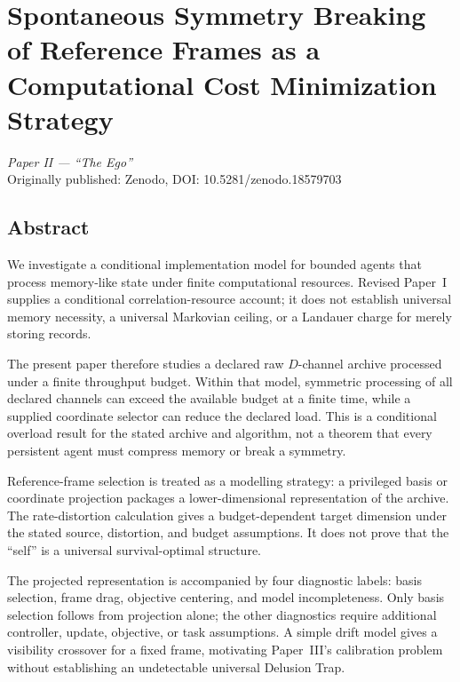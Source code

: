 \documentclass[12pt,a4paper,openany]{book}
\begin{document}

\chapter{Spontaneous Symmetry Breaking of Reference Frames as a Computational Cost Minimization Strategy}
\label{T-chap:paperII}

\begin{center}
\textit{Paper II --- ``The Ego''}\\[0.5em]
Originally published: Zenodo, DOI: 10.5281/zenodo.18579703
\end{center}

\bigskip

\section*{Abstract}
We investigate a conditional implementation model for bounded agents
that process memory-like state under finite computational resources.
Revised Paper~I~\cite{Liu2026TDOME_I} supplies a conditional
correlation-resource account; it does not establish universal memory
necessity, a universal Markovian ceiling, or a Landauer charge for
merely storing records.

The present paper therefore studies a declared raw $D$-channel archive
processed under a finite throughput budget.  Within that model,
symmetric processing of all declared channels can exceed the available
budget at a finite time, while a supplied coordinate selector can reduce
the declared load.  This is a conditional overload result for the stated
archive and algorithm, not a theorem that every persistent agent must
compress memory or break a symmetry.

Reference-frame selection is treated as a modelling strategy: a
privileged basis or coordinate projection packages a lower-dimensional
representation of the archive.  The rate-distortion calculation gives a
budget-dependent target dimension under the stated source, distortion,
and budget assumptions.  It does not prove that the ``self'' is a
universal survival-optimal structure.

The projected representation is accompanied by four diagnostic labels:
basis selection, frame drag, objective centering, and model
incompleteness.  Only basis selection follows from projection alone; the
other diagnostics require additional controller, update, objective, or
task assumptions.  A simple drift model gives a visibility crossover for
a fixed frame, motivating Paper~III's calibration problem without
establishing an undetectable universal Delusion Trap.
\end{document}
